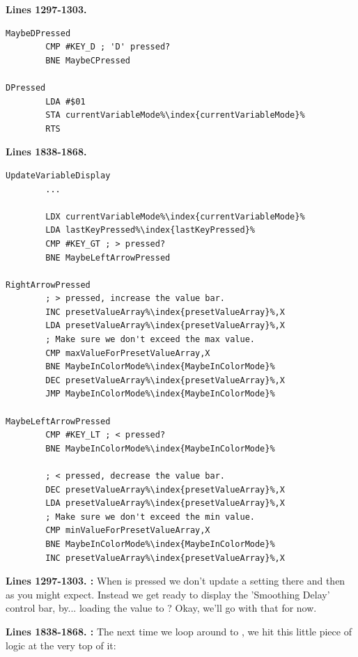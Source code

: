 \textbf{Lines 1297-1303. }
\begin{lstlisting}[caption=From \icode{CheckKeyboardInput\index{CheckKeyboardInput}}.,escapechar=\%]
MaybeDPressed   
        CMP #KEY_D ; 'D' pressed?
        BNE MaybeCPressed

DPressed
        LDA #$01
        STA currentVariableMode%\index{currentVariableMode}%
        RTS 
\end{lstlisting}
\textbf{Lines 1838-1868. }
\begin{lstlisting}[caption=From \icode{CheckKeyboardInputForActiveVariable}.,escapechar=\%]
UpdateVariableDisplay   
        ...

        LDX currentVariableMode%\index{currentVariableMode}%
        LDA lastKeyPressed%\index{lastKeyPressed}%
        CMP #KEY_GT ; > pressed?
        BNE MaybeLeftArrowPressed

RightArrowPressed
        ; > pressed, increase the value bar.
        INC presetValueArray%\index{presetValueArray}%,X
        LDA presetValueArray%\index{presetValueArray}%,X
        ; Make sure we don't exceed the max value.
        CMP maxValueForPresetValueArray,X
        BNE MaybeInColorMode%\index{MaybeInColorMode}%
        DEC presetValueArray%\index{presetValueArray}%,X
        JMP MaybeInColorMode%\index{MaybeInColorMode}%

MaybeLeftArrowPressed   
        CMP #KEY_LT ; < pressed?
        BNE MaybeInColorMode%\index{MaybeInColorMode}%

        ; < pressed, decrease the value bar.
        DEC presetValueArray%\index{presetValueArray}%,X
        LDA presetValueArray%\index{presetValueArray}%,X
        ; Make sure we don't exceed the min value.
        CMP minValueForPresetValueArray,X
        BNE MaybeInColorMode%\index{MaybeInColorMode}%
        INC presetValueArray%\index{presetValueArray}%,X

\end{lstlisting}
\clearpage
\textbf{Lines 1297-1303. :} When  is pressed we don't
update a setting there and then as you might expect. Instead we get ready to display the 'Smoothing
Delay' control bar, by... loading the value  to ? Okay, we'll
go with that for now.

\textbf{Lines 1838-1868. :}  The next time we loop around
to , we hit this little piece of logic at the very top of it:

